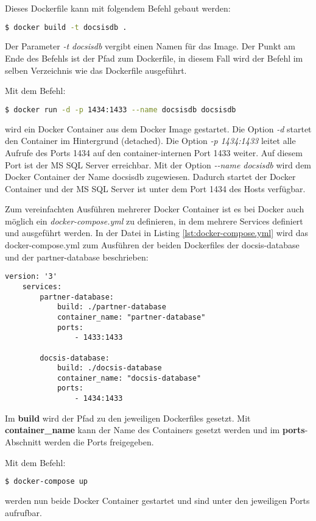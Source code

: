 Dieses Dockerfile kann mit folgendem Befehl gebaut werden:
\begin{lstlisting}[language=bash]
$ docker build -t docsisdb .
\end{lstlisting}
Der Parameter \textit{-t docsisdb} vergibt einen Namen für das Image. Der Punkt am Ende des Befehls ist der Pfad zum Dockerfile, in diesem Fall wird der Befehl im selben Verzeichnis wie das Dockerfile ausgeführt.

Mit dem Befehl:
\begin{lstlisting}[language=bash]
$ docker run -d -p 1434:1433 --name docsisdb docsisdb
\end{lstlisting}
wird ein Docker Container aus dem Docker Image gestartet. Die Option \textit{-d} startet den Container im Hintergrund (detached). Die Option \textit{-p 1434:1433} leitet alle Aufrufe des Ports 1434 auf den container-internen Port 1433 weiter. Auf diesem Port ist der MS SQL Server erreichbar. Mit der Option \textit{-{}-name docsisdb} wird dem Docker Container der Name \glqq docsisdb\grqq{} zugewiesen. Dadurch startet der Docker Container und der MS SQL Server ist unter dem Port 1434 des Hosts verfügbar.

Zum vereinfachten Ausführen mehrerer Docker Container ist es bei Docker auch möglich ein \textit{docker-compose.yml} zu definieren, in dem mehrere Services definiert und ausgeführt werden.
In der Datei in Listing \ref{lst:docker-compose.yml} wird das docker-compose.yml zum Ausführen der beiden Dockerfiles der docsis-database und der partner-database beschrieben:
\begin{lstlisting}[language=docker-compose-2, caption={docker-compose.yml}, label=lst:docker-compose.yml]
	version: '3'
	services:
		partner-database:
			build: ./partner-database
			container_name: "partner-database"
			ports:
				- 1433:1433
	
		docsis-database:
			build: ./docsis-database
			container_name: "docsis-database"
			ports:
				- 1434:1433
\end{lstlisting}
Im \textbf{build} wird der Pfad zu den jeweiligen Dockerfiles gesetzt. Mit \textbf{container\_name} kann der Name des Containers gesetzt werden und im \textbf{ports}-Abschnitt werden die Ports freigegeben.

Mit dem Befehl:
\begin{lstlisting}[language=bash]
	$ docker-compose up
\end{lstlisting}
werden nun beide Docker Container gestartet und sind unter den jeweiligen Ports aufrufbar.

